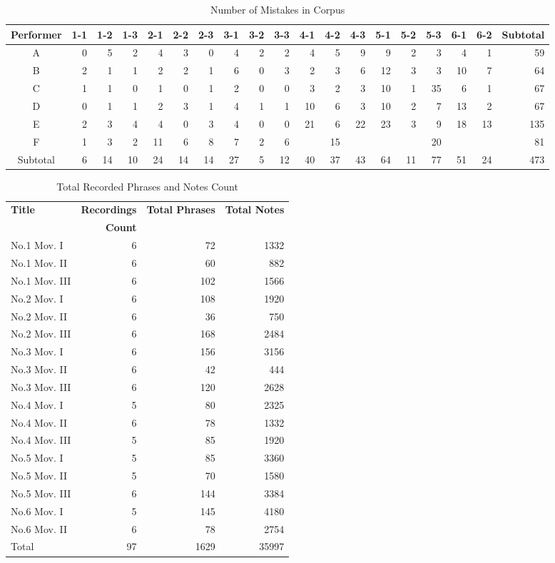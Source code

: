 \begin{table}
   \centering
   \caption{Number of Mistakes in Corpus}
   \label{tab:mistakes}
   \begin{tabular}{crrrrrrrrrrrrrrrrr|r}
      \hline
      Performer&1-1&1-2&1-3&2-1&2-2&2-3&3-1&3-2&3-3&4-1&4-2&4-3&5-1&5-2&5-3&6-1&6-2&Subtotal\\
      \hline
      A&0&5&2&4&3&0&4&2&2&4&5&9&9&2&3&4&1&59\\
      B&2&1&1&2&2&1&6&0&3&2&3&6&12&3&3&10&7&64\\
      C&1&1&0&1&0&1&2&0&0&3&2&3&10&1&35&6&1&67\\
      D&0&1&1&2&3&1&4&1&1&10&6&3&10&2&7&13&2&67\\
      E&2&3&4&4&0&3&4&0&0&21&6&22&23&3&9&18&13&135\\
      F&1&3&2&11&6&8&7&2&6&&15&&&&20&&&81\\
      \hline
      Subtotal&6&14&10&24&14&14&27&5&12&40&37&43&64&11&77&51&24&473\\
   \end{tabular}
\end{table}
\begin{table}[bp]
   \centering
   \caption{Total Recorded Phrases and Notes Count}
   \label{tab:corpuscount}
   \begin{tabular}{lrrr}
      \hline
      \bf Title&\bf Recordings&\bf Total Phrases&\bf Total Notes\\
      &\bf Count&&\\
      \hline
      No.1 Mov. I&6&72&1332\\
      No.1 Mov. II&6&60&882\\
      No.1 Mov. III&6&102&1566\\
      No.2 Mov. I&6&108&1920\\
      No.2 Mov. II&6&36&750\\
      No.2 Mov. III&6&168&2484\\
      No.3 Mov. I&6&156&3156\\
      No.3 Mov. II&6&42&444\\
      No.3 Mov. III&6&120&2628\\
      No.4 Mov. I&5&80&2325\\
      No.4 Mov. II&6&78&1332\\
      No.4 Mov. III&5&85&1920\\
      No.5 Mov. I&5&85&3360\\
      No.5 Mov. II&5&70&1580\\
      No.5 Mov. III&6&144&3384\\
      No.6 Mov. I&5&145&4180\\
      No.6 Mov. II&6&78&2754\\
      \hline
      Total&97&1629&35997\\
      \hline
   \end{tabular}
\end{table}


